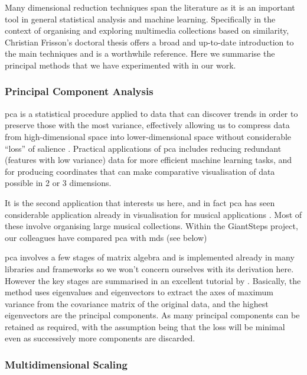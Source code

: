 Many dimensional reduction techniques span the literature as it is an important tool in general statistical analysis and machine learning. Specifically in the context of organising and exploring multimedia collections based on similarity, Christian Frisson's doctoral thesis \citeyearpar{frisson2015} offers a broad and up-to-date introduction to the main techniques and is a worthwhile reference. Here we summarise the principal methods that we have experimented with in our work.

\subsubsection{Principal Component Analysis}

\acrfull{pca} is a statistical procedure applied to data that can discover trends in order to preserve those with the most variance, effectively allowing us to compress data from high-dimensional space into lower-dimensional space without considerable ``loss'' of salience \citep{Hackeling2014}. Practical applications of \acrshort{pca} includes reducing redundant (features with low variance) data for more efficient machine learning tasks, and for producing coordinates that can make comparative visualisation of data possible in 2 or 3 dimensions.

It is the second application that interests us here, and in fact \acrshort{pca} has seen considerable application already in visualisation for musical applications \citep{Cooper2006}. Most of these involve organising large musical collections. Within the GiantSteps project, our colleagues have compared \acrshort{pca} with \acrshort{mds} (see below) 

\acrshort{pca} involves a few stages of matrix algebra and is implemented already in many libraries and frameworks so we won't concern ourselves with its derivation here. However the key stages are summarised in an excellent tutorial by \cite{Smith2002a}. Basically, the method uses eigenvalues and eigenvectors to extract the axes of maximum variance from the covariance matrix of the original data, and the highest eigenvectors are the principal components. As many principal components can be retained as required, with the assumption being that the loss will be minimal even as successively more components are discarded.

\subsubsection{Multidimensional Scaling}

